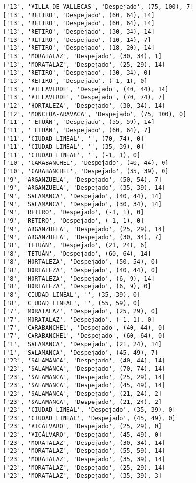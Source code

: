 \documentclass[11pt]{article}
\begin{document}
\begin{Verbatim}[commandchars=\\\{\}]
['13', 'VILLA DE VALLECAS', 'Despejado', (75, 100), 7]
['13', 'RETIRO', 'Despejado', (60, 64), 14]
['13', 'RETIRO', 'Despejado', (60, 64), 14]
['13', 'RETIRO', 'Despejado', (30, 34), 14]
['13', 'RETIRO', 'Despejado', (10, 14), 7]
['13', 'RETIRO', 'Despejado', (18, 20), 14]
['13', 'MORATALAZ', 'Despejado', (30, 34), 1]
['13', 'MORATALAZ', 'Despejado', (25, 29), 14]
['13', 'RETIRO', 'Despejado', (30, 34), 0]
['13', 'RETIRO', 'Despejado', (-1, 1), 0]
['13', 'VILLAVERDE', 'Despejado', (40, 44), 14]
['13', 'VILLAVERDE', 'Despejado', (70, 74), 7]
['12', 'HORTALEZA', 'Despejado', (30, 34), 14]
['12', 'MONCLOA-ARAVACA', 'Despejado', (75, 100), 0]
['11', 'TETUÁN', 'Despejado', (55, 59), 14]
['11', 'TETUÁN', 'Despejado', (60, 64), 7]
['11', 'CIUDAD LINEAL', '', (70, 74), 0]
['11', 'CIUDAD LINEAL', '', (35, 39), 0]
['11', 'CIUDAD LINEAL', '', (-1, 1), 0]
['10', 'CARABANCHEL', 'Despejado', (40, 44), 0]
['10', 'CARABANCHEL', 'Despejado', (35, 39), 0]
['9', 'ARGANZUELA', 'Despejado', (50, 54), 7]
['9', 'ARGANZUELA', 'Despejado', (35, 39), 14]
['9', 'SALAMANCA', 'Despejado', (40, 44), 14]
['9', 'SALAMANCA', 'Despejado', (30, 34), 14]
['9', 'RETIRO', 'Despejado', (-1, 1), 0]
['9', 'RETIRO', 'Despejado', (-1, 1), 0]
['9', 'ARGANZUELA', 'Despejado', (25, 29), 14]
['9', 'ARGANZUELA', 'Despejado', (30, 34), 7]
['8', 'TETUÁN', 'Despejado', (21, 24), 6]
['8', 'TETUÁN', 'Despejado', (60, 64), 14]
['8', 'HORTALEZA', 'Despejado', (50, 54), 0]
['8', 'HORTALEZA', 'Despejado', (40, 44), 0]
['8', 'HORTALEZA', 'Despejado', (6, 9), 14]
['8', 'HORTALEZA', 'Despejado', (6, 9), 0]
['8', 'CIUDAD LINEAL', '', (35, 39), 0]
['8', 'CIUDAD LINEAL', '', (55, 59), 0]
['7', 'MORATALAZ', 'Despejado', (25, 29), 0]
['7', 'MORATALAZ', 'Despejado', (-1, 1), 0]
['7', 'CARABANCHEL', 'Despejado', (40, 44), 0]
['7', 'CARABANCHEL', 'Despejado', (60, 64), 0]
['1', 'SALAMANCA', 'Despejado', (21, 24), 14]
['1', 'SALAMANCA', 'Despejado', (45, 49), 7]
['23', 'SALAMANCA', 'Despejado', (40, 44), 14]
['23', 'SALAMANCA', 'Despejado', (70, 74), 14]
['23', 'SALAMANCA', 'Despejado', (25, 29), 14]
['23', 'SALAMANCA', 'Despejado', (45, 49), 14]
['23', 'SALAMANCA', 'Despejado', (21, 24), 2]
['23', 'SALAMANCA', 'Despejado', (21, 24), 2]
['23', 'CIUDAD LINEAL', 'Despejado', (35, 39), 0]
['23', 'CIUDAD LINEAL', 'Despejado', (45, 49), 0]
['23', 'VICÁLVARO', 'Despejado', (25, 29), 0]
['23', 'VICÁLVARO', 'Despejado', (45, 49), 0]
['23', 'MORATALAZ', 'Despejado', (30, 34), 14]
['23', 'MORATALAZ', 'Despejado', (55, 59), 14]
['23', 'MORATALAZ', 'Despejado', (35, 39), 14]
['23', 'MORATALAZ', 'Despejado', (25, 29), 14]
['23', 'MORATALAZ', 'Despejado', (35, 39), 3]

\end{Verbatim}
\end{document}

